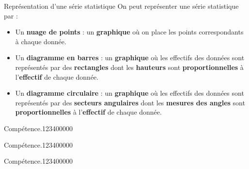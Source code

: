 \begin{pageCours}
\begin{DefT}{Représentation d'une série statistique}
On peut représenter une série statistique par :
\begin{itemize}
\item Un \textbf{nuage de points} : un \textbf{graphique} où on place les points correspondants à chaque donnée.
\item Un \textbf{diagramme en barres} : un \textbf{graphique} où les effectifs des données sont représentés par des \textbf{rectangles} dont les \textbf{hauteurs} sont \textbf{proportionnelles} à l'\textbf{effectif} de chaque donnée.
\item Un \textbf{diagramme circulaire} : un \textbf{graphique} où les effectifs des données sont représentés par des \textbf{secteurs angulaires} dont les \textbf{mesures des angles} sont \textbf{proportionnelles} à l'\textbf{effectif} de chaque donnée.
\end{itemize}
\end{DefT}

\end{pageCours} %


\begin{pageAD}  %
\restoregeometry %


\begin{ExoCad}{Compétence.}{1234}{0}{0}{0}{0}{0}

\end{ExoCad}


\begin{ExoCad}{Compétence.}{1234}{0}{0}{0}{0}{0}

\end{ExoCad}


\begin{ExoCad}{Compétence.}{1234}{0}{0}{0}{0}{0}

\end{ExoCad}
 
\end{pageAD} %


